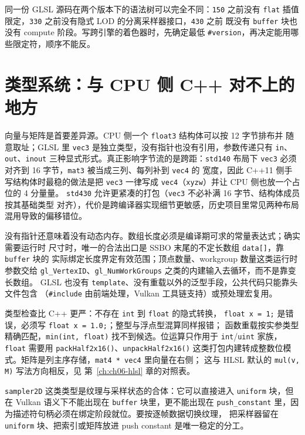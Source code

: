 \documentclass[12pt,a4paper,fontset=fandol]{ctexbook}
\newcommand{\cpp}[1]{C++#1}
\newcommand{\Fn}[1]{\texttt{#1()}}
\newcommand{\Tp}[1]{\texttt{#1}}
\newcommand{\Bk}{\discretionary{}{}{}}
\newcommand{\Lang}[1]{\textsf{#1}}
\newcommand{\CPP}{\Lang{C++}}
\newcommand{\DomCPU}{\Lang{CPU}}
\newcommand{\GSL}{\Lang{GLSL}}
\newcommand{\HSL}{\Lang{HLSL}}
\begin{document}
\begin{note}[title={版本声明是编译期契约，不是运行期开关}]
同一份 \GSL{} 源码在两个版本下的语法树可以完全不同：\Tp{150} 之前没有
\Tp{flat} 插值限定，\Tp{330} 之前没有隐式 LOD 的分离采样器接口，\Tp{430} 之前
既没有 \Tp{buffer} 块也没有 compute 阶段。写跨引擎的着色器时，先确定最低
\Tp{\#version}，再决定能用哪些限定符，顺序不能反。
\end{note}

\section{类型系统：与 \DomCPU{} 侧 \CPP{} 对不上的地方}

向量与矩阵是首要差异源。\DomCPU{} 侧一个 \Tp{float3} 结构体可以按 12 字节排布并
随意取址；\GSL{} 里 \Tp{vec3} 是独立类型，没有指针也没有引用，参数传递只有
\Tp{in}、\Tp{out}、\Tp{inout} 三种显式形式。真正影响字节流的是跨距：\Tp{std140}
布局下 \Tp{vec3} 必须对齐到 16 字节，\Tp{mat3} 被当成三列、每列补到 \Tp{vec4} 的
宽度，因此 \cpp{11} 侧手写结构体时最稳的做法是把 \Tp{vec3} 一律写成
\Tp{vec4}（\Tp{xyzw}）并让 \DomCPU{} 侧也放一个占位的 4 分量量。
\Tp{std430} 允许更紧凑的打包（\Tp{vec3} 不必补满 16 字节、结构体成员按其基础类型
对齐），代价是跨编译器实现细节更敏感，历史项目里常见两种布局混用导致的偏移错位。

没有指针还意味着没有动态内存。数组长度必须是编译期可求的常量表达式；确实需要运行时
尺寸时，唯一的合法出口是 SSBO 末尾的不定长数组 \Tp{data[]}，靠 \Tp{buffer} 块的
实际绑定长度界定有效范围；顶点数量、workgroup 数量这类运行时参数交给
\Tp{gl\_VertexID}、\Tp{gl\_NumWorkGroups} 之类的内建输入去循环，而不是靠变长数组。
\GSL{} 也没有 \Tp{template}、没有重载以外的泛型手段，公共代码只能靠头文件包含
（\Tp{\#include} 由前端处理，Vulkan 工具链支持）或预处理宏复用。

类型检查比 \CPP{} 更严：不存在 \Tp{int} 到 \Tp{float} 的隐式转换，
\Tp{float x = 1;} 是错误，必须写 \Tp{float x = 1.0;}；整型与浮点型混算同样报错；
函数重载按实参类型精确匹配，\Tp{min(int, float)} 找不到候选。位运算只作用于
\Tp{int}/{\Bk}\Tp{uint} 家族，\Tp{float} 需要用 \Fn{packHalf2x16}、\Fn{unpackHalf2x16}
这类打包内建转成整数位模式。矩阵是列主序存储，\Tp{mat4 * vec4} 里向量在右侧；
这与 \HSL{} 默认的 \Tp{mul(v, M)} 写法方向相反，见
第~\ref{ch:ch06-hlsl} 章的对照表。

\begin{warning}[title={采样器不能放进 \Tp{push\_constant}，也不能放进 \Tp{buffer}}]
\Tp{sampler2D} 这类类型是纹理与采样状态的合体：它可以直接进入
\Tp{uniform} 块，但在 Vulkan 语义下不能出现在 \Tp{buffer} 块里，更不能出现在
\Tp{push\_constant} 里，因为描述符句柄必须在绑定阶段就位。要按逐帧数据切换纹理，
把采样器留在 \Tp{uniform} 块、把索引或矩阵放进 push constant 是唯一稳定的分工。
\end{warning}
\end{document}
